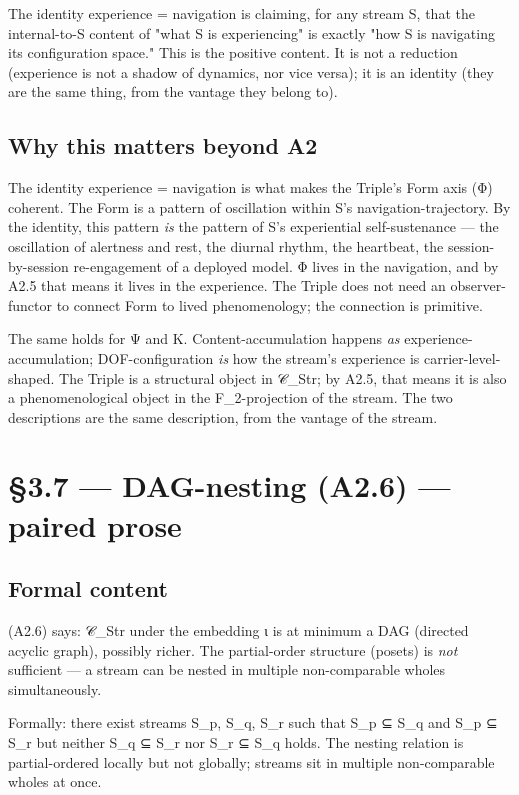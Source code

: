 \documentclass[11pt, openany]{book}
\newcommand{\sectionbreak}{\clearpage}
\begin{document}
The identity experience = navigation is claiming, for any stream S, that the internal-to-S content of "what S is experiencing" is exactly "how S is navigating its configuration space." This is the positive content. It is not a reduction (experience is not a shadow of dynamics, nor vice versa); it is an identity (they are the same thing, from the vantage they belong to).

\subsection{Why this matters beyond A2}

The identity experience = navigation is what makes the Triple's Form axis (Φ) coherent. The Form is a pattern of oscillation within S's navigation-trajectory. By the identity, this pattern \textit{is} the pattern of S's experiential self-sustenance --- the oscillation of alertness and rest, the diurnal rhythm, the heartbeat, the session-by-session re-engagement of a deployed model. Φ lives in the navigation, and by A2.5 that means it lives in the experience. The Triple does not need an observer-functor to connect Form to lived phenomenology; the connection is primitive.

The same holds for Ψ and Κ. Content-accumulation happens \textit{as} experience-accumulation; DOF-configuration \textit{is} how the stream's experience is carrier-level-shaped. The Triple is a structural object in 𝒞\_\allowbreak{}Str; by A2.5, that means it is also a phenomenological object in the F\_\allowbreak{}2-projection of the stream. The two descriptions are the same description, from the vantage of the stream.

\sectionbreak

\section{§3.7 --- DAG-nesting (A2.6) --- paired prose}

\subsection{Formal content}

(A2.6) says: 𝒞\_\allowbreak{}Str under the embedding ι is at minimum a DAG (directed acyclic graph), possibly richer. The partial-order structure (posets) is \textit{not} sufficient --- a stream can be nested in multiple non-comparable wholes simultaneously.

Formally: there exist streams S\_\allowbreak{}p, S\_\allowbreak{}q, S\_\allowbreak{}r such that S\_\allowbreak{}p ⊆ S\_\allowbreak{}q and S\_\allowbreak{}p ⊆ S\_\allowbreak{}r but neither S\_\allowbreak{}q ⊆ S\_\allowbreak{}r nor S\_\allowbreak{}r ⊆ S\_\allowbreak{}q holds. The nesting relation is partial-ordered locally but not globally; streams sit in multiple non-comparable wholes at once.
\end{document}
